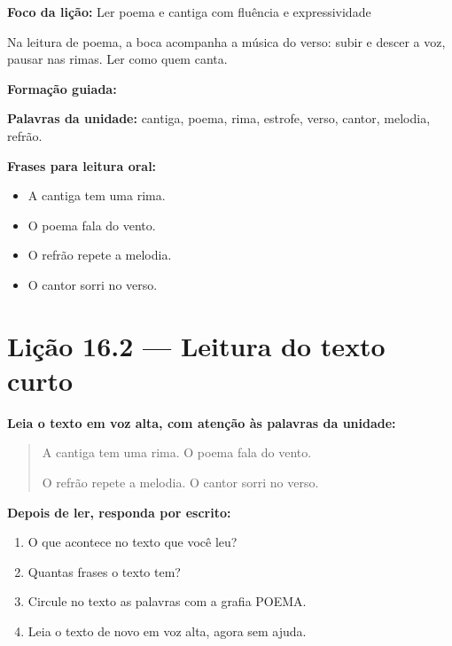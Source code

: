 \textbf{Foco da lição:} Ler poema e cantiga com fluência e expressividade


\begin{boquinha}
Na leitura de poema, a boca acompanha a música do verso: subir e descer a voz, pausar nas rimas. Ler como quem canta.
\end{boquinha}

\noindent\textbf{Formação guiada:}

\begin{center}
\end{center}

\noindent\textbf{Palavras da unidade:} cantiga, poema, rima, estrofe, verso, cantor, melodia, refrão.

\noindent\textbf{Frases para leitura oral:}
\begin{itemize}[leftmargin=1.6em]
  \item A cantiga tem uma rima.
  \item O poema fala do vento.
  \item O refrão repete a melodia.
  \item O cantor sorri no verso.
\end{itemize}

\section{Lição 16.2 --- Leitura do texto curto}

\noindent\textbf{Leia o texto em voz alta, com atenção às palavras da unidade:}


\begin{quote}
A cantiga tem uma rima. O poema fala do vento.

O refrão repete a melodia. O cantor sorri no verso.
\end{quote}

\textbf{Depois de ler, responda por escrito:}
\begin{enumerate}

  \item O que acontece no texto que você leu?
  \begin{center}
  \underline{\hspace{12cm}}
  \end{center}

  \item Quantas frases o texto tem?
  \begin{center}
  \underline{\hspace{12cm}}
  \end{center}

  \item Circule no texto as palavras com a grafia POEMA.

  \item Leia o texto de novo em voz alta, agora sem ajuda.

\end{enumerate}

